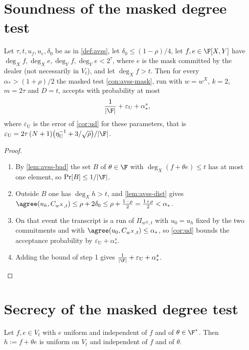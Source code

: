 {{\section{Soundness of the masked degree test}

{\renewcommand{\theproposition}{P2}
\begin{proposition}[Soundness]\label{prop:avss-sound}
Let $\tau,t,u_f,u_e,\delta_0$ be as in \ref{def:avss}, let $\delta_0\le(1-\rho)/4$, let
$f,e\in\F[X,Y]$ have $\deg_Xf,\deg_Xe,\deg_Yf,\deg_Ye<2^\tau$, where $e$ is the mask committed by the
dealer (not necessarily in $V_t$), and let $\deg_Xf>t$. Then for every $\alpha_*>(1+\rho)/2$ the masked test
\ref{con:avss-mask}, run with $w=w^X$, $k=2$, $m=2\tau$ and $D=t$, accepts with probability at
most
\[
\frac1{|\F|}+\varepsilon_{\mathrm U}+\alpha_*^s,
\]
where $\varepsilon_{\mathrm U}$ is the error of \ref{cor:ud} for these parameters, that is
$\varepsilon_{\mathrm U}=2\tau\,(N+1)\big(\eta_{\mathrm U}^{-1}+3/\sqrt\rho\big)/|\F|$.
\end{proposition}}

\begin{proof}\begin{enumerate}
\item By \ref{lem:avss-bad} the set $B$ of $\theta\in\F$ with $\deg_X(f+\theta e)\le t$ has at
most one element, so $\Pr[B]\le1/|\F|$.
\item Outside $B$ one has $\deg_Xh>t$, and \ref{lem:avss-dist} gives
$\agree(u_h,C_{w^X,t})\le\rho+2\delta_0\le\rho+\frac{1-\rho}2=\frac{1+\rho}2<\alpha_*$.
\item On that event the transcript is a run of $\Pi_{w^X,t}$ with $u_0=u_h$ fixed by the two
commitments and with $\agree(u_0,C_{w^X,t})\le\alpha_*$, so \ref{cor:ud} bounds the acceptance
probability by $\varepsilon_{\mathrm U}+\alpha_*^s$.
\item Adding the bound of step 1 gives $\frac1{|\F|}+\varepsilon_{\mathrm U}+\alpha_*^s$.
\end{enumerate}\end{proof}

\section{Secrecy of the masked degree test}

\begin{lemma}\label{lem:avss-uniform}
Let $f,e\in V_t$ with $e$ uniform and independent of $f$ and of $\theta\in\F^*$. Then
$h:=f+\theta e$ is uniform on $V_t$ and independent of $f$ and of $\theta$.
\end{lemma}

}}
